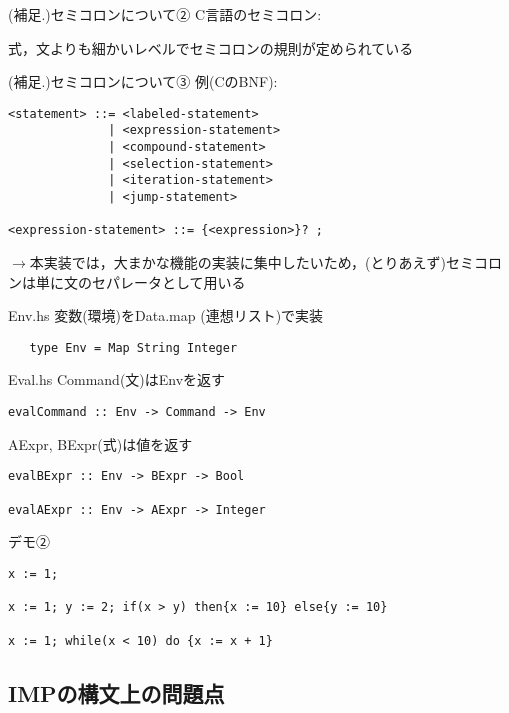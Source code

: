 \documentclass[uplatex,dvipdfmx,ja=standard]{beamer}
\begin{document}
\begin{frame}[fragile]{(補足.)セミコロンについて②}
    C言語のセミコロン:

    式，文よりも細かいレベルでセミコロンの規則が定められている
\end{frame}

\begin{frame}[fragile]{(補足.)セミコロンについて③}
    例(CのBNF):
    \begin{verbatim}
<statement> ::= <labeled-statement>
              | <expression-statement>
              | <compound-statement>
              | <selection-statement>
              | <iteration-statement>
              | <jump-statement>

<expression-statement> ::= {<expression>}? ;
    \end{verbatim}
    $\to$本実装では，大まかな機能の実装に集中したいため，(とりあえず)セミコロンは単に文のセパレータとして用いる
\end{frame}

\begin{frame}[fragile]{Env.hs}
    変数(環境)をData.map (連想リスト)で実装
   \begin{verbatim}
   type Env = Map String Integer 
    \end{verbatim}
\end{frame}

\begin{frame}[fragile]{Eval.hs}
    Command(文)はEnvを返す
   \begin{verbatim}
evalCommand :: Env -> Command -> Env
    \end{verbatim}
    AExpr, BExpr(式)は値を返す
    \begin{verbatim}
evalBExpr :: Env -> BExpr -> Bool

evalAExpr :: Env -> AExpr -> Integer
    \end{verbatim}
\end{frame}

\begin{frame}[fragile]{デモ②}
    \begin{verbatim}
x := 1; 

x := 1; y := 2; if(x > y) then{x := 10} else{y := 10}

x := 1; while(x < 10) do {x := x + 1}
    \end{verbatim}
\end{frame}

\subsection{IMPの構文上の問題点}
\end{document}
